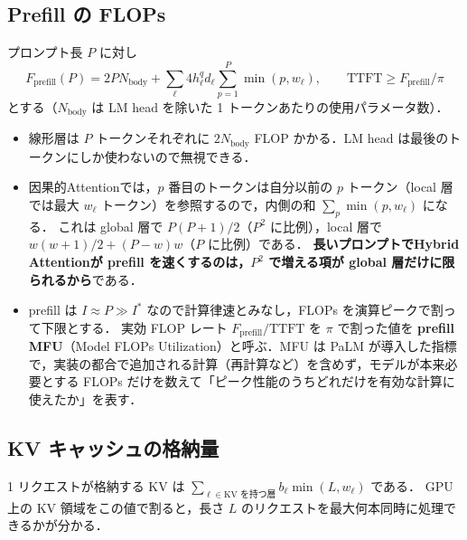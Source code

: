 \documentclass[a4paper,10pt]{ltjsarticle}
\begin{document}
\subsection{Prefill の FLOPs}
\label{sec:theory-prefill}
プロンプト長 $P$ に対し
\begin{equation}
F_\text{prefill}(P) = 2P N_\text{body} + \sum_\ell 4h^q_\ell d_\ell \sum_{p=1}^{P}\min(p,w_\ell),
\qquad \text{TTFT} \ge F_\text{prefill}/\pi
\label{eq:prefill}
\end{equation}
とする（$N_\text{body}$ は LM head を除いた 1 トークンあたりの使用パラメータ数）．
\begin{itemize}
\item 線形層は $P$ トークンそれぞれに $2N_\text{body}$ FLOP かかる．LM head は最後のトークンにしか使わないので無視できる．
\item 因果的Attentionでは，$p$ 番目のトークンは自分以前の $p$ トークン（local 層では最大 $w_\ell$ トークン）を参照するので，内側の和 $\sum_p \min(p,w_\ell)$ になる．
      これは global 層で $P(P+1)/2$（$P^2$ に比例），local 層で $w(w+1)/2 + (P-w)w$（$P$ に比例）である．
      \textbf{長いプロンプトでHybrid Attentionが prefill を速くするのは，$P^2$ で増える項が global 層だけに限られるから}である．
\item prefill は $I \approx P \gg I^\ast$ なので計算律速とみなし，FLOPs を演算ピークで割って下限とする．
      実効 FLOP レート $F_\text{prefill}/\text{TTFT}$ を $\pi$ で割った値を \textbf{prefill MFU}（Model FLOPs Utilization）と呼ぶ．MFU は PaLM\cite{palm} が導入した指標で，実装の都合で追加される計算（再計算など）を含めず，モデルが本来必要とする FLOPs だけを数えて「ピーク性能のうちどれだけを有効な計算に使えたか」を表す．
\end{itemize}

\subsection{KV キャッシュの格納量}
\label{sec:theory-kvstore}
1 リクエストが格納する KV は $\sum_{\ell \in \text{KV を持つ層}} b_\ell \min(L,w_\ell)$ である．
GPU 上の KV 領域をこの値で割ると，長さ $L$ のリクエストを最大何本同時に処理できるかが分かる．
\end{document}
